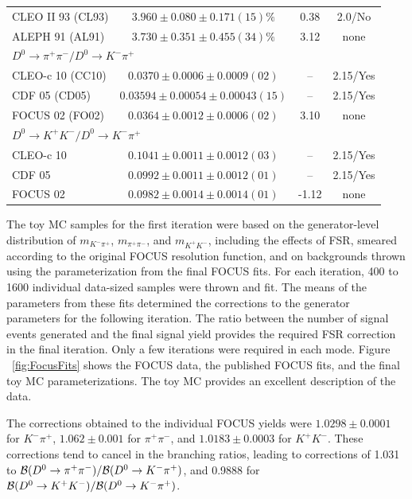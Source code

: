 \begin{table}
\begin{tabular}{lccc}
      CLEO II 93 (CL93) \cite{Akerib:1993pm}   & $3.960 \pm 0.080 \pm 0.171(15)\%$ & 0.38 & 2.0/No \\
      ALEPH 91   (AL91) \cite{Decamp:1991jw}   & $3.730 \pm 0.351 \pm 0.455(34)\%$ & 3.12 & none \\
\multicolumn{4}{l}{$D^{0} \to \pi^{+}\pi^{-} / D^{0} \to K^{-} \pi^{+}$} \\
      CLEO-c 10  (CC10) \cite{Mendez:2009aa}   & $0.0370  \pm 0.0006  \pm 0.0009(02)$  & --   & 2.15/Yes \\
      CDF 05     (CD05) \cite{Acosta:2004ts}   & $0.03594 \pm 0.00054 \pm 0.00043(15)$ & --   & 2.15/Yes \\
      FOCUS 02   (FO02) \cite{Link:2002hi}     & $0.0364  \pm 0.0012  \pm 0.0006(02)$  & 3.10 & none \\
\multicolumn{4}{l}{$D^{0} \to K^{+}K^{-} / D^{0} \to K^{-} \pi^{+}$} \\
      CLEO-c 10   \cite{Mendez:2009aa}         & $0.1041 \pm 0.0011 \pm 0.0012(03)$ & --    & 2.15/Yes \\ 
      CDF 05      \cite{Acosta:2004ts}         & $0.0992 \pm 0.0011 \pm 0.0012(01)$ & --    & 2.15/Yes \\
      FOCUS 02    \cite{Link:2002hi}           & $0.0982 \pm 0.0014 \pm 0.0014(01)$ & -1.12 & none \\ \hline
\end{tabular}
\end{table}

The toy MC samples for the first iteration were based on the generator-level 
distribution of $m_{K^-\pi^+}$, $m_{\pi^+\pi^-}$, and $m_{K^+K^-}$, including 
the effects of FSR, smeared according to the original FOCUS resolution 
function,  and on backgrounds thrown using the parameterization from the final
FOCUS fits.  For each iteration, 400 to 1600 individual data-sized samples were 
thrown and fit. The means of the parameters from these fits determined the 
corrections to the generator parameters for the following iteration.  The 
ratio between the number of signal events generated and the final signal 
yield provides the required FSR correction in the final iteration.  Only a 
few iterations were required in each mode.  Figure ~\ref{fig:FocusFits} 
shows the FOCUS data, the published FOCUS fits, and the final toy MC 
parameterizations.  The toy MC provides an excellent description of the 
data.

The corrections obtained to the individual FOCUS yields were 
$1.0298\pm 0.0001$ for $K^-\pi^+$, $1.062 \pm 0.001$ for $\pi^+\pi^-$, 
and $1.0183 \pm 0.0003$ for $K^+K^-$.  These corrections tend to cancel 
in the branching ratios, leading to corrections of 1.031 to  
${\cal B}(D^0\to \pi^+\pi^-)/{\cal B}(D^0\to K^-\pi^+)$, and 0.9888 for 
${\cal B}(D^0\to K^+ K^-)/{\cal B}(D^0\to K^-\pi^+)$.

